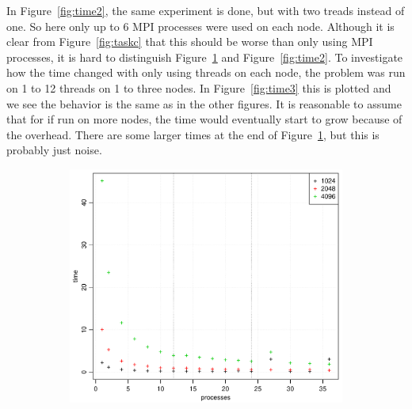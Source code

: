 In Figure~\ref{fig:time2}, the same experiment is done, but with two treads instead of one. So here only up to 6 MPI processes were used on each node. Although it is clear from Figure~\ref{fig:taskc} that this should be worse than only using MPI processes, it is hard to distinguish Figure~\ref{fig:time1} and Figure~\ref{fig:time2}. To investigate how the time changed with only using threads on each node, the problem was run on 1 to 12 threads on 1 to three nodes. In Figure~\ref{fig:time3} this is plotted and we see the behavior is the same as in the other figures. It is reasonable to assume that for if run on more nodes, the time would eventually start to grow because of the overhead. There are some larger times at the end of Figure~\ref{fig:time1}, but this is probably just noise.\\
%
\begin{figure}[h!]
  \centering
  \begin{subfigure}[b]{0.48\textwidth}
    \includegraphics[width=\textwidth]{./Figures/taskbTimeProc1.pdf}
    \caption{}
    \label{fig:time1}
  \end{subfigure}%
  \quad
  \begin{subfigure}[b]{0.48\textwidth}

\end{subfigure}
\end{figure}
